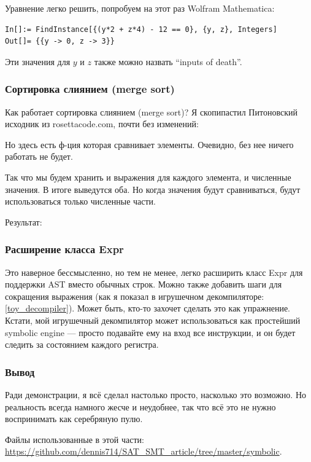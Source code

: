 Уравнение легко решить, попробуем на этот раз Wolfram Mathematica:

\begin{lstlisting}
In[]:= FindInstance[{(y*2 + z*4) - 12 == 0}, {y, z}, Integers]
Out[]= {{y -> 0, z -> 3}}
\end{lstlisting}

Эти значения для $y$ и $z$ также можно назвать ``inputs of death''.

\subsubsection{Сортировка слиянием (merge sort)}

Как работает сортировка слиянием (merge sort)?
Я скопипастил Питоновский исходник из rosettacode.com, почти без изменений:



Но здесь есть ф-ция которая сравнивает элементы.
Очевидно, без нее ничего работать не будет.

Так что мы будем хранить и выражения для каждого элемента, и численные значения.
В итоге выведутся оба.
Но когда значения будут сравниваться, будут использоваться только численные части.

Результат:



\subsubsection{Расширение класса Expr}

Это наверное бессмысленно, но тем не менее, легко расширить класс Expr для поддержки \ac{AST} вместо обычных строк.
Можно также добавить шаги для сокращения выражения (как я показал в игрушечном декомпиляторе: \ref{toy_decompiler}).
Может быть, кто-то захочет сделать это как упражнение.
Кстати, мой игрушечный декомпилятор может использоваться как простейший symbolic engine --- просто подавайте ему на вход
все инструкции, и он будет следить за состоянием каждого регистра.

\subsubsection{Вывод}

Ради демонстрации, я всё сделал настолько просто, насколько это возможно.
Но реальность всегда намного жесче и неудобнее, так что всё это не нужно воспринимать как серебряную пулю.

Файлы использованные в этой части: \url{https://github.com/dennis714/SAT_SMT_article/tree/master/symbolic}.

